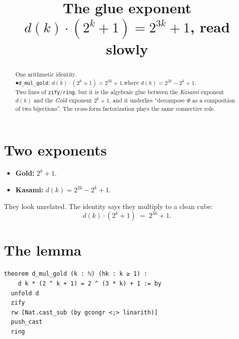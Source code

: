\documentclass[11pt]{article}
\title{\textbf{The glue exponent}\\[4pt]
\large $d(k)\cdot(2^k+1)=2^{3k}+1$, read slowly}
\author{}
\date{}
\begin{document}
\maketitle

\begin{abstract}
\noindent
One arithmetic identity.\\[2pt]
$\bullet$\quad \texttt{d\_mul\_gold}:\;\;
$d(k)\cdot(2^k+1)=2^{3k}+1$,\quad where $d(k)=2^{2k}-2^k+1$.\\[6pt]
\noindent
Two lines of \texttt{zify}/\texttt{ring}, but it is the algebraic glue between the
\emph{Kasami} exponent $d(k)$ and the \emph{Gold} exponent $2^k+1$, and it underlies
``decompose $\Phi$ as a composition of two bijections''. The cross-form
factorization plays the same connective role.
\end{abstract}

\bigskip

\section*{Two exponents}

\begin{itemize}\itemsep4pt
  \item \textbf{Gold:}\;\; $2^k+1$.
  \item \textbf{Kasami:}\;\; $d(k)=2^{2k}-2^k+1$.
\end{itemize}
They look unrelated. The identity says they multiply to a clean cube:
\[
d(k)\cdot(2^k+1)\;=\;2^{3k}+1 .
\]

\bigskip

\section{The lemma}

\begin{lstlisting}
theorem d_mul_gold (k : ℕ) (hk : k ≥ 1) :
    d k * (2 ^ k + 1) = 2 ^ (3 * k) + 1 := by
  unfold d
  zify
  rw [Nat.cast_sub (by gcongr <;> linarith)]
  push_cast
  ring
\end{lstlisting}

\end{document}
